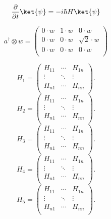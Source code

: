\begin{equation}
    \frac{\partial}{\partial t} \ket{\psi} = - i \hbar H \ket{\psi}
\end{equation}

\begin{equation}
a^\dagger \otimes w = \begin{pmatrix}
0\cdot w & 1\cdot w & 0\cdot w\\
0\cdot w & 0\cdot w & \sqrt{2}\cdot w\\
0\cdot w & 0\cdot w & 0\cdot w\\
\end{pmatrix}
\end{equation}

\begin{equation}
    H_1 = \begin{pmatrix}
H_{11} & \cdots & H_{1n} \\
\vdots & \ddots & \vdots \\
H_{n1} & \cdots & H_{nn} \\
\end{pmatrix}.
\end{equation}
\begin{equation}
    H_2 = \begin{pmatrix}
H_{11} & \cdots & H_{1n} \\
\vdots & \ddots & \vdots \\
H_{n1} & \cdots & H_{nn} \\
\end{pmatrix}.
\end{equation}
\begin{equation}
    H_3 = \begin{pmatrix}
H_{11} & \cdots & H_{1n} \\
\vdots & \ddots & \vdots \\
H_{n1} & \cdots & H_{nn} \\
\end{pmatrix}.
\end{equation}
\begin{equation}
    H_4 = \begin{pmatrix}
H_{11} & \cdots & H_{1n} \\
\vdots & \ddots & \vdots \\
H_{n1} & \cdots & H_{nn} \\
\end{pmatrix}.
\end{equation}
\begin{equation}
    H_5 = \begin{pmatrix}
H_{11} & \cdots & H_{1n} \\
\vdots & \ddots & \vdots \\
H_{n1} & \cdots & H_{nn} \\
\end{pmatrix}.
\end{equation}
